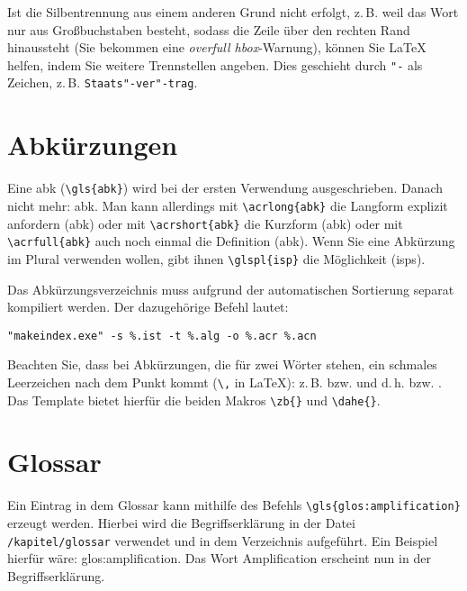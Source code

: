 Ist die Silbentrennung aus einem anderen Grund nicht erfolgt, z.\,B. weil das Wort nur aus Großbuchstaben besteht, sodass die Zeile über den rechten Rand hinaussteht (Sie bekommen eine \textit{overfull hbox}-Warnung), können Sie \LaTeX{} helfen, indem Sie weitere Trennstellen angeben. Dies geschieht durch \verb+"-+ als Zeichen, z.\,B. \verb+Staats"-ver"-trag+.

\section{Abkürzungen}

%

Eine \gls{abk} (\verb+\gls{abk}+) wird bei der ersten Verwendung ausgeschrieben. Danach nicht mehr: \gls{abk}. Man kann allerdings mit \verb+\acrlong{abk}+ die Langform explizit anfordern (\acrlong{abk}) oder mit \verb+\acrshort{abk}+ die Kurzform (\acrshort{abk}) oder mit \verb+\acrfull{abk}+ auch noch einmal die Definition (\acrfull{abk}). Wenn Sie eine Abkürzung im Plural verwenden wollen, gibt ihnen \verb+\glspl{isp}+ die Möglichkeit (\glspl{isp}).

Das Abkürzungsverzeichnis muss aufgrund der automatischen Sortierung separat kompiliert werden. Der dazugehörige Befehl lautet: 
\begin{verbatim}
"makeindex.exe" -s %.ist -t %.alg -o %.acr %.acn
\end{verbatim}



Beachten Sie, dass bei Abkürzungen, die für zwei Wörter stehen, ein schmales Leerzeichen nach dem Punkt kommt (\verb+\,+ in \LaTeX{}): z.\,B. bzw. \zb{} und d.\,h. bzw. \dahe{}. Das Template bietet hierfür die beiden Makros \verb+\zb{}+ und \verb+\dahe{}+.


\section{Glossar}
Ein Eintrag in dem Glossar kann mithilfe des Befehls \verb*|\gls{glos:amplification}| erzeugt werden. Hierbei wird die Begriffserklärung in der Datei \texttt{/kapitel/glossar} verwendet und in dem Verzeichnis aufgeführt. Ein Beispiel hierfür wäre: \gls{glos:amplification}. Das Wort Amplification erscheint nun in der Begriffserklärung. 

